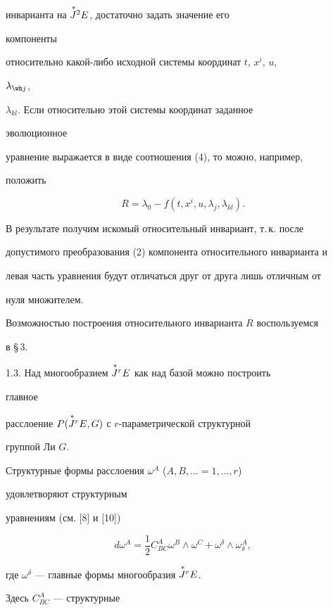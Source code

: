 инварианта на $\overset{\,*}{J}{}^2E$, достаточно задать значение его 


компоненты 


относительно какой-либо исходной системы координат $t$, $x^i$, $u$, 


$\lambda_{\wh j}$, 


$\lambda_{kl}$. Если относительно этой системы координат заданное 


эволюционное 


уравнение выражается в виде соотношения (4), то можно, например, 


положить 


$$ 


R=\lambda_0-f(t,x^i,u,\lambda_j,\lambda_{kl}). 


$$ 


В результате получим искомый относительный инвариант, т.\,к. после 


допустимого преобразования (2) компонента относительного инварианта и 


левая часть уравнения будут отличаться друг от друга лишь отличным от 


нуля множителем. 





Возможностью построения относительного инварианта $R$ воспользуемся


в \S\,3.


\medskip 


 


1.3. Над многообразием $\overset{\,*}{J}{}^r E$ как над базой можно построить 


главное 


расслоение $P(\overset{\,*}{J}{}^r E,G)$ с $r$-параметрической структурной 


группой Ли $G$. 


Структурные формы расслоения $\omega^A$ ($A,B,\dotsc=1,\dotsc,r$) 


удовлетворяют структурным 


уравнениям (см. [8] и [10]) 


$$ 


d\omega^A=\frac{1}{2}C^A_{B C}\omega^B\wedge\omega^C+\omega^\delta 


\wedge\omega^A_\delta, 


$$ 


где $\omega^\delta$ --- главные формы многообразия $\overset{\,*}{J}{}^r E$. 


Здесь $C^A_{B C}$ --- структурные 


